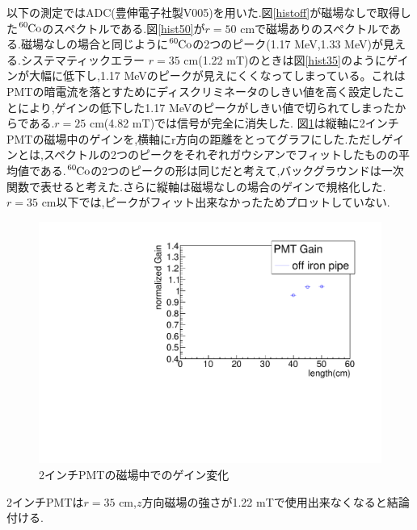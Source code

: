 以下の測定ではADC(豊伸電子社製V005)を用いた.図\ref{histoff}が磁場なしで取得した$\ce{^{60}Co}$のスペクトルである.図\ref{hist50}が$r=50$ cmで磁場ありのスペクトルである.磁場なしの場合と同じように$\ce{^{60}Co}$の2つのピーク(1.17 MeV,1.33 MeV)が見える.システマティックエラー
$r=35$ cm(1.22 mT)のときは図\ref{hist35}のようにゲインが大幅に低下し,1.17 MeVのピークが見えにくくなってしまっている。これはPMTの暗電流を落とすためにディスクリミネータのしきい値を高く設定したことにより,ゲインの低下した1.17 MeVのピークがしきい値で切られてしまったからである.$r=25$ cm(4.82 mT)では信号が完全に消失した.
図\ref{plot2inchoff}は縦軸に2インチPMTの磁場中のゲインを,横軸にr方向の距離をとってグラフにした.ただしゲインとは,スペクトルの2つのピークをそれぞれガウシアンでフィットしたものの平均値である.$\ce{^{60}Co}$の2つのピークの形は同じだと考えて,バックグラウンドは一次関数で表せると考えた.さらに縦軸は磁場なしの場合のゲインで規格化した.$r=35$ cm以下では,ピークがフィット出来なかったためプロットしていない.

\begin{figure}[t]
	\centering
		\includegraphics[angle=-90,width=15cm]{fig/iguchi/plot2inchPMT.pdf}
	\caption{2インチPMTの磁場中でのゲイン変化}
	\label{plot2inchoff}
\end{figure}
2インチPMTは$r=35$ cm,$z$方向磁場の強さが1.22 mTで使用出来なくなると結論付ける.

